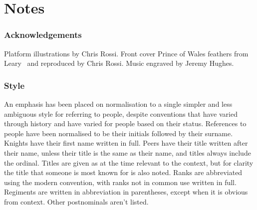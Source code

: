 \part{Notes}

\section*{Acknowledgements}

Platform illustrations by Chris Rossi. Front cover Prince of Wales feathers from Leary~\cite{leary} and reproduced by Chris Rossi. Music engraved by Jeremy Hughes.

\section*{Style}

An emphasis has been placed on normalisation to a single simpler and less ambiguous style for referring to people, despite conventions that have varied through history and have varied for people based on their status. References to people have been normalised to be their initials followed by their surname. Knights have their first name written in full. Peers have their title written after their name, unless their title is the same as their name, and titles always include the ordinal. Titles are given as at the time relevant to the context, but for clarity the title that someone is most known for is also noted. Ranks are abbreviated using the modern convention, with ranks not in common use written in full. Regiments are written in abbreviation in parentheses, except when it is obvious from context. Other postnominals aren't listed.
